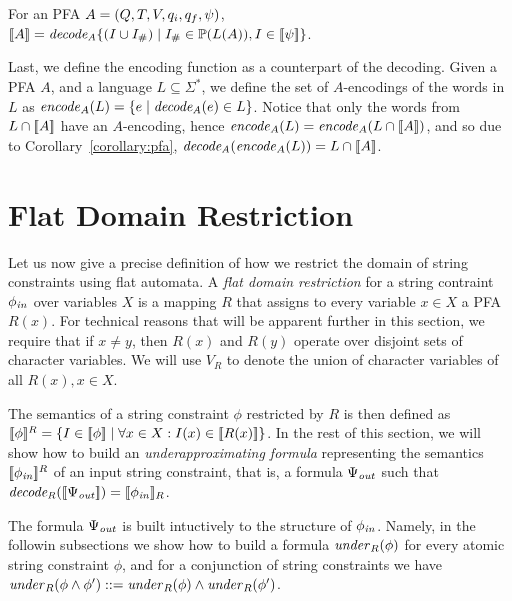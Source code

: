 \documentclass[sigplan,review,anonymous]{acmart}\settopmatter{printfolios=true,printccs=false,printacmref=false}
\begin{document}
\begin{corollary}\label{corollary:pfa}
For an PFA $A = (Q,T,V,q_i,q_f,\psi)$,
\\
$[\![A]\!] = \mathit{decode_{A}} \{(I\cup I_{\#})\mid I_{\#}\in\mathbb{P}{(L(A))} ,I\in[\![\psi]\!]\}$.
\end{corollary}
%

Last, we define the encoding function as a counterpart of the decoding. Given a PFA $A$, and a language $L\subseteq \Sigma^*$, we define the set of $A$-encodings of the words in $L$ as 
$\mathit{encode}_{A} (L) = \{e \mid \mathit{decode_{A}} (e) \in L\}$. 
%
Notice that only the words from $L\cap [\![A]\!]$ have an $A$-encoding, 
hence $\mathit{encode}_{A}(L) = \mathit{encode}_{A}(L\cap[\![A]\!])$, and so due to Corollary~\ref{corollary:pfa}, $\mathit{decode_{A}}({\mathit{encode}_{A}}(L)) = L\cap[\![A]\!]$.
%

\section{Flat Domain Restriction}
Let us now give a precise definition of how we restrict the domain of string constraints using flat automata. 
A \emph{flat domain restriction} for a string contraint $\phi_{\mathit{in}}$ over variables $X$ is a mapping $R$ that assigns to every variable $x\in X$ a PFA $R(x)$. 
For technical reasons that will be apparent further in this section, we require that if $x\neq y$, then $R(x)$ and $R(y)$ operate over disjoint sets of character variables. We will use $V_R$ to denote the union of character variables of all $R(x),x\in X$.

The semantics of a string constraint $\phi$ restricted by $R$ is then defined as 
$[\![\phi]\!]^R = \{I\in[\![\phi]\!] \mid \forall x\in X:I(x)\in[\![R(x)]\!]\}$. 
In the rest of this section, we will show how to build an \emph{underapproximating formula} representing the semantics $[\![\phi_{\mathit{in}}]\!]^R$ of an input string constraint, that is, a formula $\Psi_{\mathit{out}}$ such that 
$\mathit{decode_{R}} ([\![\Psi_{\mathit{out}}]\!]) = [\![\phi_{\mathit{in}}]\!]_R$. 

The formula $\Psi_{\mathit{out}}$ is built intuctively to the structure of $\phi_{\mathit{in}}$.
Namely, in the followin subsections we show how to build a formula $\mathit{under}_R(\phi)$ for every atomic string constraint $\phi$, 
and for a conjunction of 
string constraints we have $\mathit{under}_R(\phi \land \phi') ::= \mathit{under}_R(\phi) \land \mathit{under}_R(\phi')$.
\end{document}
